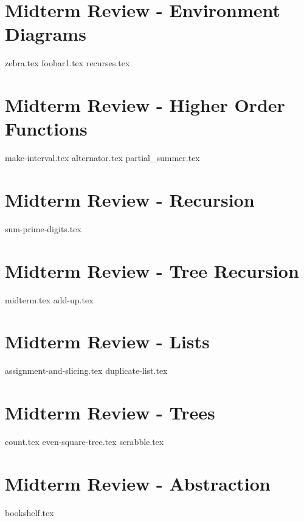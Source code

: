 \documentclass{exam}
\begin{document}
\newpage
\section{Midterm Review - Environment Diagrams}
\begin{questions}
{zebra.tex}
{foobar1.tex}
{recurses.tex}
\end{questions}

\newpage
\section{Midterm Review - Higher Order Functions}
\begin{questions}
{make-interval.tex}
{alternator.tex}
{partial_summer.tex}
\end{questions}

\section{Midterm Review - Recursion}
\begin{questions}
{sum-prime-digits.tex}
\end{questions}

\section{Midterm Review - Tree Recursion}
\begin{questions}
{midterm.tex}
{add-up.tex}
\end{questions}

\newpage
\section{Midterm Review - Lists}
\begin{questions}
{assignment-and-slicing.tex}
{duplicate-list.tex}
\end{questions}

\newpage
\section{Midterm Review - Trees}
\begin{questions}
{count.tex}
{even-square-tree.tex}
{scrabble.tex}
\end{questions}

\newpage
\section{Midterm Review - Abstraction}
{bookshelf.tex} 
\end{document}
